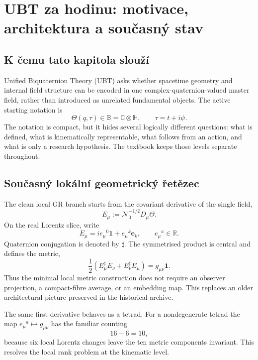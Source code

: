 
\chapter{UBT za hodinu: motivace, architektura a současný stav}
\label{ch:overview}

\section{K čemu tato kapitola slouží}
Unified Biquaternion Theory (UBT) asks whether spacetime geometry and internal
field structure can be encoded in one complex-quaternion-valued master field,
rather than introduced as unrelated fundamental objects.  The active starting
notation is
\[
 \Theta(q,\tau)\in\mathbb B=\mathbb C\otimes\mathbb H,
 \qquad \tau=t+i\psi .
\]
The notation is compact, but it hides several logically different questions:
what is defined, what is kinematically representable, what follows from an
action, and what is only a research hypothesis.  The textbook keeps those
levels separate throughout.

\section{Současný lokální geometrický řetězec}
The clean local GR branch starts from the covariant derivative of the single
field,
\[
 E_\mu:=\mathcal N_0^{-1/2}D_\mu\Theta .
\]
On the real Lorentz slice, write
\[
 E_\mu=i e_\mu{}^0\mathbf1+e_\mu{}^k\mathbf e_k,
 \qquad e_\mu{}^a\in\mathbb R.
\]
Quaternion conjugation is denoted by $\sharp$.  The symmetrised product is
central and defines the metric,
\[
 \boxed{
 \frac12\left(E_\mu^\sharp E_\nu+E_\nu^\sharp E_\mu\right)
 =g_{\mu\nu}\mathbf1 .}
\]
Thus the minimal local metric construction does not require an observer
projection, a compact-fibre average, or an embedding map.  This replaces an
older architectural picture preserved in the historical archive.

The same first derivative behaves as a tetrad.  For a nondegenerate tetrad the
map $e_\mu{}^a\mapsto g_{\mu\nu}$ has the familiar counting
\[
 16-6=10,
\]
because six local Lorentz changes leave the ten metric components invariant.
This resolves the local rank problem at the kinematic level.

